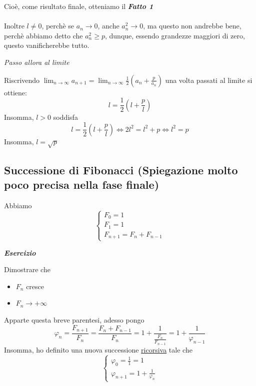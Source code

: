 \documentclass{article}
\theoremstyle{definition}
\begin{document}
Cioè, come risultato finale, otteniamo il \textbf{\textit{Fatto 1}}
\\
\\
Inoltre $l \neq 0$, perchè se $a_n \to 0$, anche $a_n^2 \to 0$, ma questo non andrebbe bene, perchè abbiamo detto che $a_n^2 \geqslant p$, dunque, essendo grandezze maggiori di zero, questo vanificherebbe tutto.
\\
\begin{center}
    \textit{Passo allora al limite}
\end{center}
Riscrivendo $\lim_{n \to \infty}a_{n+1}=\lim_{n \to \infty}\frac{1}{2}(a_n+\frac{p}{a_n})$ una volta passati al limite si ottiene:
\begin{equation}
    l=\frac{1}{2}(l+\frac{p}{l})
\end{equation}
Insomma, $l>0$ soddisfa
\begin{equation}
    l=\frac{1}{2}(l+\frac{p}{l}) \Longleftrightarrow 2l^2=l^2+p \Longleftrightarrow l^2=p
\end{equation}
Insomma, $l=\sqrt{p}$
\newpage
\subsection{Successione di Fibonacci (Spiegazione molto poco precisa nella fase finale)}
Abbiamo
\begin{equation}
    \begin{cases}
        F_0=1\\
        F_1=1\\
        F_{n+1}=F_n+F_{n-1}
    \end{cases}
    \end{equation}

    \begin{center}
        \textbf{\textit{Esercizio}}
    \end{center}
Dimostrare che 
\begin{itemize}
    \item $F_n$ cresce
    \item $F_n \to +\infty$
\end{itemize}
Apparte questa breve parentesi, adesso pongo
\begin{equation}
    \varphi_n=\frac{F_{n+1}}{F_n}=\frac{F_n+F_{n-1}}{F_n}=1+\frac{1}{\frac{F_n}{F_{n-1}}}=1+\frac{1}{\varphi_{n-1}}
\end{equation}
Insomma, ho definito una nuova successione \underline{ricorsiva} tale che
\begin{equation}
    \begin{cases}
        \varphi_0=\frac{1}{1}=1\\
        \varphi_{n+1}=1 +\frac{1}{\varphi_n}
    \end{cases}
    \end{equation}
\end{document}
